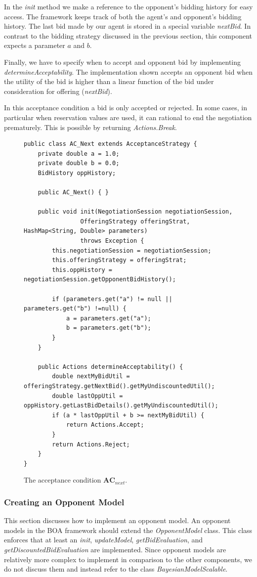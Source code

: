 \documentclass[]{article}
\begin{document}
In the \textit{init} method we make a reference to the opponent's bidding history for easy access. The framework keeps track of both the agent's and opponent's bidding history. The last bid made by our agent is stored in a special variable \textit{nextBid}. In contrast to the bidding strategy discussed in the previous section, this component expects a parameter $a$ and $b$.

Finally, we have to specify when to accept and opponent bid by implementing \textit{determineAcceptability}. The implementation shown accepts an opponent bid when the utility of the bid is higher than a linear function of the bid under consideration for offering (\textit{nextBid}).

In this acceptance condition a bid is only accepted or rejected. In some cases, in particular when reservation values are used, it can rational to end the negotiation prematurely. This is possible by returning \textit{Actions.Break}.

\begin{figure}[htb]
\begin{lstlisting}[basicstyle=\small]
public class AC_Next extends AcceptanceStrategy {
	private double a = 1.0;
	private double b = 0.0;
	BidHistory oppHistory;

	public AC_Next() { }

	public void init(NegotiationSession negotiationSession,
				OfferingStrategy offeringStrat, HashMap<String, Double> parameters)
				throws Exception {
		this.negotiationSession = negotiationSession;
		this.offeringStrategy = offeringStrat;
		this.oppHistory =  negotiationSession.getOpponentBidHistory();

		if (parameters.get("a") != null || parameters.get("b") !=null) {
			a = parameters.get("a");
			b = parameters.get("b");
		}
	}

	public Actions determineAcceptability() {
		double nextMyBidUtil = offeringStrategy.getNextBid().getMyUndiscountedUtil();
		double lastOppUtil = oppHistory.getLastBidDetails().getMyUndiscountedUtil();
		if (a * lastOppUtil + b >= nextMyBidUtil) {
			return Actions.Accept;
		}
		return Actions.Reject;
	}
}
\end{lstlisting}
\caption{The acceptance condition $\textbf{AC}_{next}$.}\label{code:acnext}
\end{figure}

\subsubsection{Creating an Opponent Model}
This section discusses how to implement an opponent model. An opponent models in the BOA framework should extend the \textit{OpponentModel} class. This class enforces that at least an \textit{init}, \textit{updateModel}, \textit{getBidEvaluation}, and \textit{getDiscountedBidEvaluation} are implemented. Since opponent models are relatively more complex to implement in comparison to the other components, we do not discuss them and instead refer to the class \textit{BayesianModelScalable}.
\end{document}
